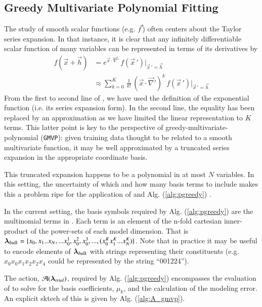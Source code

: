 \documentclass[twocolumn,aps,prd,floatfix,preprintnumbers,a4paper,nofootinbib,
superscriptaddress,10pt]{revtex4-1}
\def\gmvp#1{greedy-multivariate-polynomial#1
  (\texttt{GMVP}#1)\gdef\gmvp{\texttt{GMVP}}}
\begin{document}
\subsection{Greedy Multivariate Polynomial Fitting}
%
The study of smooth scalar functions (e.g. $\vec{f}$) often centers about the Taylor series expansion.
%
In that instance, it is clear that any infinitely differentiable scalar function of many variables can be represented in terms of its derivatives by
%
\begin{align}
  \label{eq:mvt}
  f( \vec{x} + \vec{h} ) &= e^{ \vec{x} \cdot \vec{\nabla}' } \, f(\vec{x}\,') |_{\vec{x}\,'=\vec{h}}
  \\ \nonumber
  &\approx \sum_{k=0}^{K} \, \frac{1}{k!} \, (\vec{x} \cdot \vec{\nabla}')^{k} \, f(\vec{x}\,') |_{\vec{x}\,'=\vec{h}}
\end{align}
%
From the first to second line of , we have used the definition of the exponential function (i.e. its series expansion form).
%
In the second line, the equality has been replaced by an approximation as we have limited the linear representation to $K$ terms.
%
This latter point is key to the perspective of \gmvp{}: given training data thought to be related to a smooth multivariate function, it may be well approximated by a truncated series expansion in the appropriate coordinate basis.
%
\par This truncated expansion happens to be a polynomial in at most $N$ variables.
%
In this setting, the uncertainty of which and how many basis terms to include makes this a problem ripe for the application of  and Alg. (\ref{alg:pgreedy}) .
%
\par In the current setting, the basis symbols required by Alg. (\ref{alg:pgreedy}) are the multinomial terms in .
%
Each term is an element of the n-fold cartesian inner-product of the power-sets of each model dimension. That is ${\bm{\lambda}}_{bulk} = \{x_0,x_1 .. x_N, ... x_0^1, x_0^2, x_0^3, ...  , (x_0^K x_1^K ... x_N^K) \}$.
%
Note that in practice it may be useful to encode elements of ${\bm{\lambda}}_{bulk}$ with strings representing their constituents (e.g. $x_0 x_0 x_1 x_2 x_2 x_4$ could be represented by the string ``001224'').
%
\par The action, $\mathcal{A}({\bm{\lambda}}_{trial})$, required by Alg. (\ref{alg:pgreedy}) encompasses the evaluation of  to solve for the basis coefficients, $\mu_k$, and the calculation of the modeling error.
%
An explicit sktech of this is given by Alg. (\ref{alg:A_gmvp}).
%
\hspace{1cm}
\end{document}
